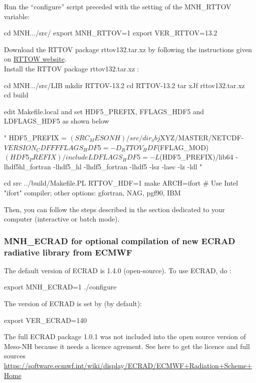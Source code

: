 Run the ``configure'' script preceded with the setting of the MNH\_RTTOV variable:
\begin{bashcode}
cd MNH.../src/
export MNH_RTTOV=1
export VER_RTTOV=13.2
\end{bashcode}

Download the RTTOV package rttov132.tar.xz by following the instructions given on \href{https://nwpsaf.eu/site/software/rttov/}{RTTOW website}. \\

Install the RTTOV package rttov132.tar.xz :
\begin{bashcode}
cd MNH.../src/LIB
mkdir RTTOV-13.2
cd RTTOV-13.2
tar xJf rttov132.tar.xz
cd build
\end{bashcode}

edit Makefile.local and set HDF5\_PREFIX, FFLAGS\_HDF5 and LDFLAGS\_HDF5 as shown below
\begin{fortrancode}
"
HDF5_PREFIX  = $(SRC_MESONH)/src/dir_obj${XYZ}/MASTER/NETCDF-${VERSION_CDFF}
FFLAGS_HDF5  = -D_RTTOV_HDF $(FFLAG_MOD)$(HDF5_PREFIX)/include
LDFLAGS_HDF5 = -L$(HDF5_PREFIX)/lib64 -lhdf5hl_fortran -lhdf5_hl -lhdf5_fortran -lhdf5 -lsz -laec -lz -ldl
"
\end{fortrancode}

\begin{bashcode}
cd src
../build/Makefile.PL RTTOV_HDF=1
make ARCH=ifort        # Use Intel "ifort" compiler; other options: gfortran, NAG, pgf90, IBM
\end{bashcode}

Then, you can follow the steps described in the section dedicated to your computer (interactive or batch mode).

\subsubsection{MNH\_ECRAD for optional compilation of new ECRAD radiative library from ECMWF}

The default version of ECRAD is 1.4.0 (open-source). To use ECRAD, do : 
\begin{bashcode}
export MNH_ECRAD=1
./configure
\end{bashcode}

The version of ECRAD is set by (by default):
\begin{bashcode}
export VER_ECRAD=140
\end{bashcode}

\begin{noteblock}
The full ECRAD package 1.0.1  was not included into the open source version of Meso-NH because it needs a licence agrement.  See here to get the licence and full sources \href{https://software.ecmwf.int/wiki/display/ECRAD/ECMWF+Radiation+Scheme+Home}{https://software.ecmwf.int/wiki/display/ECRAD/ECMWF+Radiation+Scheme+Home}
\end{noteblock}

